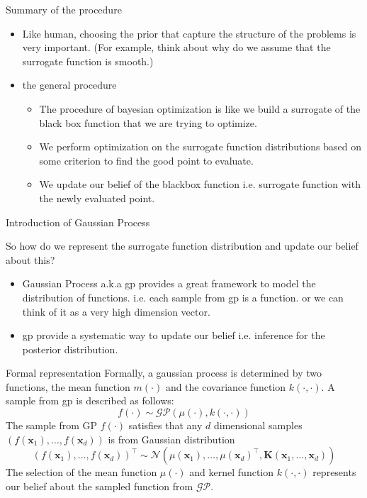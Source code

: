 \documentclass{beamer}
\begin{document}
\begin{frame}{Summary of the procedure}
\begin{itemize}
\item Like human, choosing the prior that capture the structure of the problems is very important. (For example, think about why do we assume that the surrogate function is smooth.)
\item the general procedure
\begin{itemize}
    
\item The procedure of bayesian optimization is like we build a surrogate of the black box function that we are trying to optimize. 
\item We perform optimization on the surrogate function distributions based on some criterion to find the good point to evaluate. 
\item We update our belief of the blackbox function i.e. surrogate function with the newly evaluated point.
\end{itemize}
\end{itemize}
\end{frame}

\begin{frame}{Introduction of Gaussian Process}

So how do we represent the surrogate function distribution and update our belief about this?
\begin{itemize}
\item Gaussian Process a.k.a gp provides a great framework to model the distribution of functions. i.e. each sample from gp is a function. or we can think of it as a very high dimension vector.
\item gp provide a systematic way to update our belief i.e. inference for the posterior distribution.
\end{itemize}


\end{frame}

\begin{frame}{Formal representation}
Formally, a gaussian process is determined by two functions, the mean function $m(\cdot)$ and the covariance function $k(\cdot, \cdot)$. A sample from gp is described as follows:
$$f(\cdot) \sim \mathcal{GP}(\mu(\cdot), k(\cdot, \cdot))$$
The sample from GP $f(\cdot)$ satisfies that any $d$ dimensional samples $(f(\mathbf{x}_1), \dots, f(\mathbf{x}_d))$ is from Gaussian distribution $$(f(\mathbf{x}_1), \dots, f(\mathbf{x}_d))^\top \sim \mathcal{N}(\mu(\mathbf{x}_1), \dots, \mu(\mathbf{x}_d)^\top, \mathbf{K}(\mathbf{x}_1, \dots, \mathbf{x}_d))$$
The selection of the mean function $\mu(\cdot)$ and kernel function $k(\cdot, \cdot)$ represents our belief about the sampled function from $\mathcal{GP}$.
\end{frame}
\end{document}
